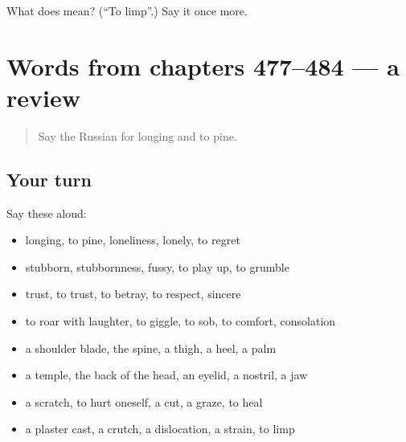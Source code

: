 \begin{tcolorbox}[breakable,colback=teal!4,colframe=teal!35!black,title={Before you move on}]
What does  mean? (\textquotedblleft{}To limp\textquotedblright{}.) Say it once more.
\end{tcolorbox}
\section[(dialogue)]{Words from chapters 477–484 — a review}

\label{lesson:RU-R484-review-477-484}



\begin{quote}
Say the Russian for longing and to pine.
\end{quote}

\subsection*{Your turn}
Say these aloud:

\begin{itemize}
\raggedright
  \item longing, to pine, loneliness, lonely, to regret
  \item stubborn, stubbornness, fussy, to play up, to grumble
  \item trust, to trust, to betray, to respect, sincere
  \item to roar with laughter, to giggle, to sob, to comfort, consolation
  \item a shoulder blade, the spine, a thigh, a heel, a palm
  \item a temple, the back of the head, an eyelid, a nostril, a jaw
  \item a scratch, to hurt oneself, a cut, a graze, to heal
  \item a plaster cast, a crutch, a dislocation, a strain, to limp
\end{itemize}

